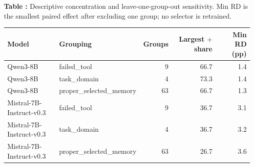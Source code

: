\begin{center}
\label{tab:concentration}
\textbf{Table \thetable:} Descriptive concentration and leave-one-group-out sensitivity. Min RD is the smallest paired effect after excluding one group; no selector is retrained.\par\smallskip
\small
\begin{tabular}{llrrr}
\toprule
Model & Grouping & Groups & Largest $+$ share & Min RD (pp) \\
\midrule
Qwen3-8B & failed\_tool & 9 & 66.7 & 1.4 \\
Qwen3-8B & task\_domain & 4 & 73.3 & 1.4 \\
Qwen3-8B & proper\_selected\_memory & 63 & 66.7 & 1.3 \\
Mistral-7B-Instruct-v0.3 & failed\_tool & 9 & 36.7 & 3.1 \\
Mistral-7B-Instruct-v0.3 & task\_domain & 4 & 36.7 & 3.2 \\
Mistral-7B-Instruct-v0.3 & proper\_selected\_memory & 63 & 26.7 & 3.6 \\
\bottomrule
\end{tabular}
\end{center}
